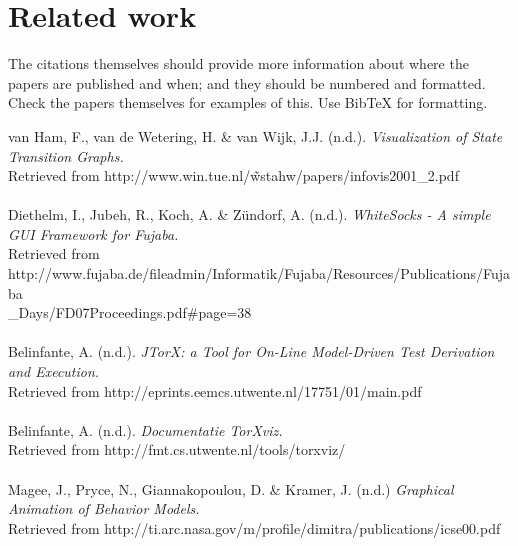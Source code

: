 \documentclass[11pt,a4paper]{article}
\begin{document}
\section{Related work}

The citations themselves should provide more information about where the papers are published and when; and they should be numbered and formatted. Check the papers themselves for examples of this. Use BibTeX for formatting.

van Ham, F., van de Wetering, H. \& van Wijk, J.J. (n.d.). \textit{Visualization of State Transition Graphs.}\\
Retrieved from http://www.win.tue.nl/\~wstahw/papers/infovis2001\_2.pdf
\\\\
Diethelm, I., Jubeh, R., Koch, A. \& Zündorf, A. (n.d.). \textit{WhiteSocks - A simple GUI Framework for Fujaba.}\\ Retrieved from http://www.fujaba.de/fileadmin/Informatik/Fujaba/Resources/Publications/Fujaba\\\_Days/FD07Proceedings.pdf\#page=38
\\\\
Belinfante, A. (n.d.). \textit{JTorX: a Tool for On-Line Model-Driven Test Derivation and Execution.} \\Retrieved from http://eprints.eemcs.utwente.nl/17751/01/main.pdf
\\\\
Belinfante, A. (n.d.). \textit{Documentatie TorXviz.}\\ Retrieved from http://fmt.cs.utwente.nl/tools/torxviz/
\\\\
Magee, J., Pryce, N., Giannakopoulou, D. \& Kramer, J. (n.d.) \textit{Graphical Animation of Behavior Models.}\\ Retrieved from http://ti.arc.nasa.gov/m/profile/dimitra/publications/icse00.pdf 
\end{document}
